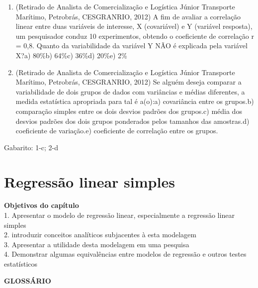 \documentclass[
]{book}
\newenvironment{objectives}{
  \definecolor{shadecolor}{rgb}{0.764,0.992,0.686}  %
  \color{black}
  \begin{shaded}}
 {\end{shaded}}
\begin{document}
\begin{enumerate}
\def\labelenumi{\arabic{enumi}.}
\item
  (Retirado de Analista de Comercialização e Logística Júnior Transporte Marítimo, Petrobrás, CESGRANRIO, 2012) A fim de avaliar a correlação linear entre duas variáveis de interesse, X (covariável) e Y (variável resposta), um pesquisador conduz 10 experimentos, obtendo o coeficiente de correlação r = 0,8. Quanto da variabilidade da variável Y NÃO é explicada pela variável X?a) 80\%b) 64\%c) 36\%d) 20\%e) 2\%
\item
  (Retirado de Analista de Comercialização e Logística Júnior Transporte Marítimo, Petrobrás, CESGRANRIO, 2012) Se alguém deseja comparar a variabilidade de dois grupos de dados com variâncias e médias diferentes, a medida estatística apropriada para tal é a(o):a) covariância entre os grupos.b) comparação simples entre os dois desvios padrões dos grupos.c) média dos desvios padrões dos dois grupos ponderados pelos tamanhos das amostras.d) coeficiente de variação.e) coeficiente de correlação entre os grupos.
\end{enumerate}

Gabarito: 1-c; 2-d

\hypertarget{regressuxe3o-linear-simples}{%
\chapter{Regressão linear simples}\label{regressuxe3o-linear-simples}}

\begin{objectives}
\textbf{Objetivos do capítulo}\\
1. Apresentar o modelo de regressão linear, especialmente a regressão linear simples\\
2. introduzir conceitos analíticos subjacentes à esta modelagem\\
3. Apresentar a utilidade desta modelagem em uma pesquisa\\
4. Demonstrar algumas equivalências entre modelos de regressão e outros testes estatísticos

\end{objectives}

\textbf{GLOSSÁRIO}
\end{document}
